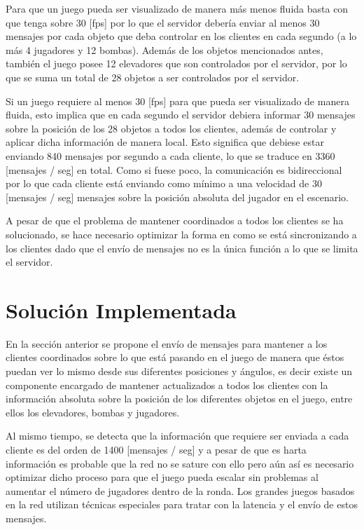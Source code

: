 \documentclass[a4paper,12pt,openany,oneside]{book}
\begin{document}
Para que un juego pueda ser visualizado de manera más menos fluida basta con que tenga sobre 30 [fps] \cite{VALVE1} por lo que el servidor debería enviar al menos 30 mensajes por cada objeto que deba controlar en los clientes en cada segundo (a lo más 4 jugadores y 12 bombas). Además de los objetos mencionados antes, también el juego posee 12 elevadores que son controlados por el servidor, por lo que se suma un total de 28 objetos a ser controlados por el servidor.

Si un juego requiere al menos 30 [fps] para que pueda ser visualizado de manera fluida, esto implica que en cada segundo el servidor debiera informar 30 mensajes sobre la posición de los 28 objetos a todos los clientes, además de controlar y aplicar dicha información de manera local. Esto significa que debiese estar enviando 840 mensajes por segundo a cada cliente, lo que se traduce en 3360 [mensajes / seg] en total. Como si fuese poco, la comunicación es bidireccional por lo que cada cliente está enviando como mínimo a una velocidad de 30 [mensajes / seg] mensajes sobre la posición absoluta del jugador en el escenario.

A pesar de que el problema de mantener coordinados a todos los clientes se ha solucionado, se hace necesario optimizar la forma en como se está sincronizando a los clientes dado que el envío de mensajes no es la única función a lo que se limita el servidor. 
\section{Solución Implementada}
En la sección anterior se propone el envío de mensajes para mantener a los clientes coordinados sobre lo que está pasando en el juego de manera que éstos puedan ver lo mismo desde sus diferentes posiciones y ángulos, es decir existe un componente encargado de mantener actualizados a todos los clientes con la información absoluta sobre la posición de los diferentes objetos en el juego, entre ellos los elevadores, bombas y jugadores.

Al mismo tiempo, se detecta que la información que requiere ser enviada a cada cliente es del orden de 1400 [mensajes / seg] y a pesar de que es harta información es probable que la red no se sature con ello pero aún así es necesario optimizar dicho proceso para que el juego pueda escalar sin problemas al aumentar el número de jugadores dentro de la ronda. Los grandes juegos basados en la red utilizan técnicas especiales para tratar con la latencia y el envío de estos mensajes.
\end{document}
